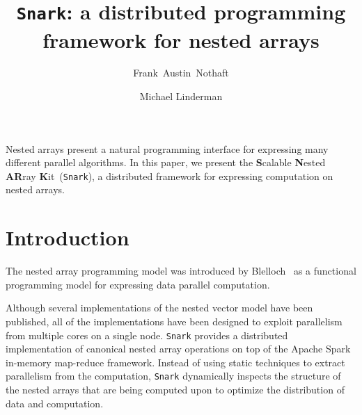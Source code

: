 \documentclass[10pt,twocolumn]{article}
\date{}
\theoremstyle{plain}
\begin{document}
\title{\texttt{Snark}: a distributed programming framework for nested arrays}
\author[1]{Frank~Austin~Nothaft}
\author[2]{Michael Linderman}

\maketitle

\raggedbottom

\abstract

Nested arrays present a natural programming interface for expressing many different parallel
algorithms. In this paper, we present the \textbf{S}calable \textbf{N}ested \textbf{AR}ray
\textbf{K}it~(\texttt{Snark}), a distributed framework for expressing computation on nested arrays.

\section{Introduction}

\label{sec:introduction}

The nested array programming model was introduced by Blelloch~\cite{blelloch90} as a
functional programming model for expressing data parallel computation.

Although several implementations of the nested vector model have been published, all of the
implementations have been designed to exploit parallelism from multiple cores on a single node.
\texttt{Snark} provides a distributed implementation of canonical nested array operations on top of the
Apache Spark~\cite{zaharia10} in-memory map-reduce framework. Instead of using static techniques to
extract parallelism from the computation, \texttt{Snark} dynamically inspects the structure of the nested
arrays that are being computed upon to optimize the distribution of data and computation.




\end{document}
